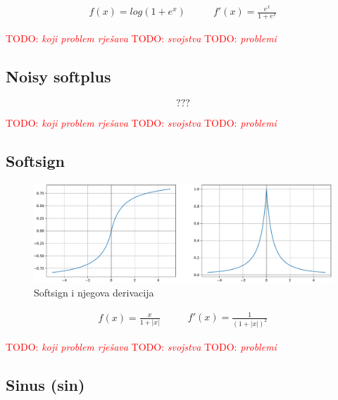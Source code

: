 \documentclass[times, utf8, diplomski]{fer}
\def\TODO#1{\noindent\textcolor{red}{TODO: \textit{#1}}\newline}
\def\todo#1{\TODO{#1}}
\def\todoimg#1{\begin{center} \textcolor{red}{\big[ IMAGE: \textit{#1} \big]} \end{center}}
\begin{document}
\begin{equation}
\begin{split}
f(x) = log(1+e^x)
\end{split}
\qquad
\begin{split}
f'(x) = \frac{e^x}{1+e^x}
\end{split}
\end{equation}

\todo{koji problem rješava}
\todo{svojstva}
\todo{problemi}

\subsection{Noisy softplus}

\todoimg{}

\begin{equation}
???
\end{equation}

\todo{koji problem rješava}
\todo{svojstva}
\todo{problemi}

\subsection{Softsign}

\begin{figure}[H]
\includegraphics[width=\textwidth]{Softsign.pdf}
\centering
\caption{Softsign i njegova derivacija}
\label{fig:softsign}
\end{figure}

\begin{equation}
\begin{split}
f(x) = \frac{x}{1+|x|}
\end{split}
\qquad
\begin{split}
f'(x) = \frac{1}{(1+|x|)^2}
\end{split}
\end{equation}

\todo{koji problem rješava}
\todo{svojstva}
\todo{problemi}

\subsection{Sinus (sin)}
\end{document}
